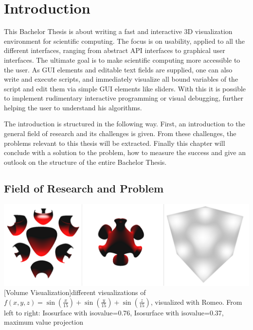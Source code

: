 \section{Introduction}
This Bachelor Thesis is about writing a fast and interactive 3D visualization environment for scientific computing. 
The focus is on usability, applied to all the different interfaces, ranging from abstract API interfaces to graphical user interfaces. 
The ultimate goal is to make scientific computing more accessible to the user.
As \ac{GUI} elements and editable text fields are supplied, one can also write and execute scripts, and immediately visualize all bound variables of the script and edit them via simple \ac{GUI} elements like sliders. 
With this it is possible to implement rudimentary interactive programming or visual debugging, further helping the user to understand his algorithms.

The introduction is structured in the following way.
First, an introduction to the general field of research and its challenges is given. 
From these challenges, the problems relevant to this thesis will be extracted.
Finally this chapter will conclude with a solution to the problem, how to measure the success and give an outlook on the structure of the entire Bachelor Thesis.
 
\subsection{Field of Research and Problem}

\vspace{1em}
\begin{minipage}{\linewidth}
    \centering
    \includegraphics[width=0.7\linewidth]{graphics/surfaces.png}
    [Volume Visualization]{different visualizations of $f(x,y,z)=\sin(\frac{x}{15})+\sin(\frac{y}{15})+\sin(\frac{z}{15})$, visualized with Romeo. From left to right: Isosurface with isovalue=0.76, Isosurface with isovalue=0.37, maximum value projection}
    \label{fig:volume}
\end{minipage}
\vspace{1em}


